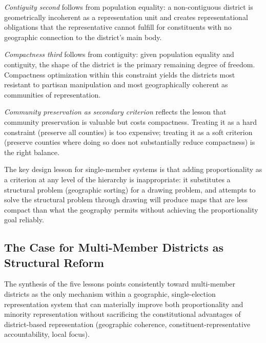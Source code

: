 \emph{Contiguity second} follows from population equality: a non-contiguous
district is geometrically incoherent as a representation unit and creates
representational obligations that the representative cannot fulfill for
constituents with no geographic connection to the district's main body.

\emph{Compactness third} follows from contiguity: given population equality
and contiguity, the shape of the district is the primary remaining degree of
freedom.  Compactness optimization within this constraint yields the districts
most resistant to partisan manipulation \citep{polsby1991third} and most
geographically coherent as communities of representation.

\emph{Community preservation as secondary criterion} reflects the lesson that
community preservation is valuable but costs compactness.  Treating it as a
hard constraint (preserve all counties) is too expensive; treating it as a
soft criterion (preserve counties where doing so does not substantially reduce
compactness) is the right balance.

The key design lesson for single-member systems is that adding proportionality
as a criterion at any level of the hierarchy is inappropriate: it substitutes
a structural problem (geographic sorting) for a drawing problem, and attempts
to solve the structural problem through drawing will produce maps that are less
compact than what the geography permits without achieving the proportionality
goal reliably.

\subsection{The Case for Multi-Member Districts as Structural Reform}

The synthesis of the five lessons points consistently toward multi-member
districts as the only mechanism within a geographic, single-election
representation system that can materially improve both proportionality and
minority representation without sacrificing the constitutional advantages of
district-based representation (geographic coherence, constituent-representative
accountability, local focus).

